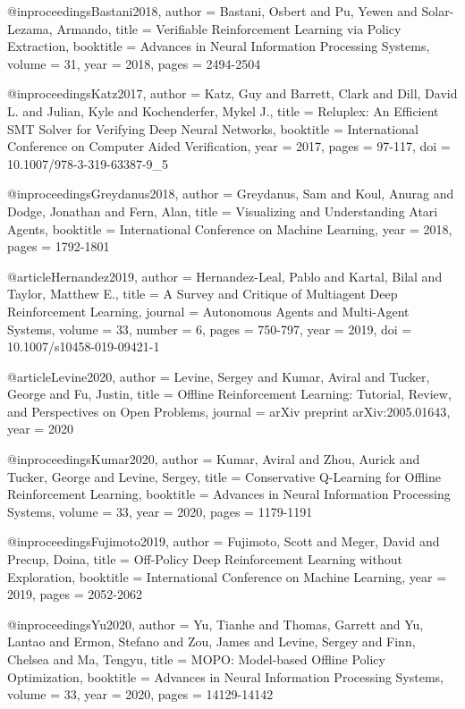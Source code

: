@inproceedings{Bastani2018,
  author = {Bastani, Osbert and Pu, Yewen and Solar-Lezama, Armando},
  title = {Verifiable Reinforcement Learning via Policy Extraction},
  booktitle = {Advances in Neural Information Processing Systems},
  volume = {31},
  year = {2018},
  pages = {2494-2504}
}

@inproceedings{Katz2017,
  author = {Katz, Guy and Barrett, Clark and Dill, David L. and Julian, Kyle and Kochenderfer, Mykel J.},
  title = {Reluplex: An Efficient SMT Solver for Verifying Deep Neural Networks},
  booktitle = {International Conference on Computer Aided Verification},
  year = {2017},
  pages = {97-117},
  doi = {10.1007/978-3-319-63387-9_5}
}

@inproceedings{Greydanus2018,
  author = {Greydanus, Sam and Koul, Anurag and Dodge, Jonathan and Fern, Alan},
  title = {Visualizing and Understanding Atari Agents},
  booktitle = {International Conference on Machine Learning},
  year = {2018},
  pages = {1792-1801}
}

@article{Hernandez2019,
  author = {Hernandez-Leal, Pablo and Kartal, Bilal and Taylor, Matthew E.},
  title = {A Survey and Critique of Multiagent Deep Reinforcement Learning},
  journal = {Autonomous Agents and Multi-Agent Systems},
  volume = {33},
  number = {6},
  pages = {750-797},
  year = {2019},
  doi = {10.1007/s10458-019-09421-1}
}

@article{Levine2020,
  author = {Levine, Sergey and Kumar, Aviral and Tucker, George and Fu, Justin},
  title = {Offline Reinforcement Learning: Tutorial, Review, and Perspectives on Open Problems},
  journal = {arXiv preprint arXiv:2005.01643},
  year = {2020}
}

@inproceedings{Kumar2020,
  author = {Kumar, Aviral and Zhou, Aurick and Tucker, George and Levine, Sergey},
  title = {Conservative Q-Learning for Offline Reinforcement Learning},
  booktitle = {Advances in Neural Information Processing Systems},
  volume = {33},
  year = {2020},
  pages = {1179-1191}
}

@inproceedings{Fujimoto2019,
  author = {Fujimoto, Scott and Meger, David and Precup, Doina},
  title = {Off-Policy Deep Reinforcement Learning without Exploration},
  booktitle = {International Conference on Machine Learning},
  year = {2019},
  pages = {2052-2062}
}

@inproceedings{Yu2020,
  author = {Yu, Tianhe and Thomas, Garrett and Yu, Lantao and Ermon, Stefano and Zou, James and Levine, Sergey and Finn, Chelsea and Ma, Tengyu},
  title = {MOPO: Model-based Offline Policy Optimization},
  booktitle = {Advances in Neural Information Processing Systems},
  volume = {33},
  year = {2020},
  pages = {14129-14142}
}

